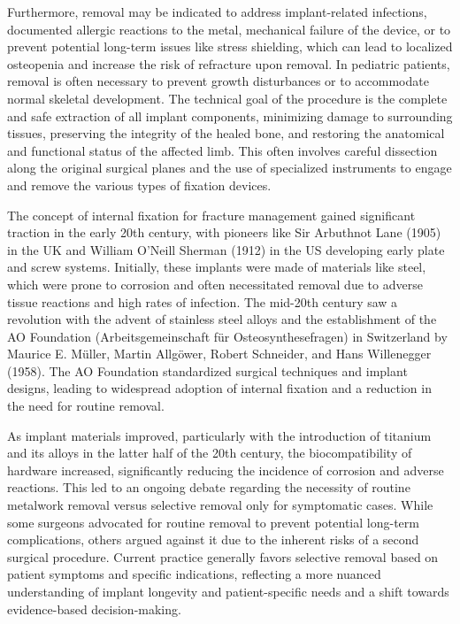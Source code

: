 Furthermore, removal may be indicated to address implant-related infections, documented allergic reactions to the metal, mechanical failure of the device, or to prevent potential long-term issues like stress shielding, which can lead to localized osteopenia and increase the risk of refracture upon removal. In pediatric patients, removal is often necessary to prevent growth disturbances or to accommodate normal skeletal development. The technical goal of the procedure is the complete and safe extraction of all implant components, minimizing damage to surrounding tissues, preserving the integrity of the healed bone, and restoring the anatomical and functional status of the affected limb. This often involves careful dissection along the original surgical planes and the use of specialized instruments to engage and remove the various types of fixation devices.

The concept of internal fixation for fracture management gained significant traction in the early 20th century, with pioneers like Sir Arbuthnot Lane (1905) in the UK and William O'Neill Sherman (1912) in the US developing early plate and screw systems. Initially, these implants were made of materials like steel, which were prone to corrosion and often necessitated removal due to adverse tissue reactions and high rates of infection. The mid-20th century saw a revolution with the advent of stainless steel alloys and the establishment of the AO Foundation (Arbeitsgemeinschaft f\"ur Osteosynthesefragen) in Switzerland by Maurice E. M\"uller, Martin Allg\"ower, Robert Schneider, and Hans Willenegger (1958). The AO Foundation standardized surgical techniques and implant designs, leading to widespread adoption of internal fixation and a reduction in the need for routine removal.

As implant materials improved, particularly with the introduction of titanium and its alloys in the latter half of the 20th century, the biocompatibility of hardware increased, significantly reducing the incidence of corrosion and adverse reactions. This led to an ongoing debate regarding the necessity of routine metalwork removal versus selective removal only for symptomatic cases. While some surgeons advocated for routine removal to prevent potential long-term complications, others argued against it due to the inherent risks of a second surgical procedure. Current practice generally favors selective removal based on patient symptoms and specific indications, reflecting a more nuanced understanding of implant longevity and patient-specific needs and a shift towards evidence-based decision-making.

